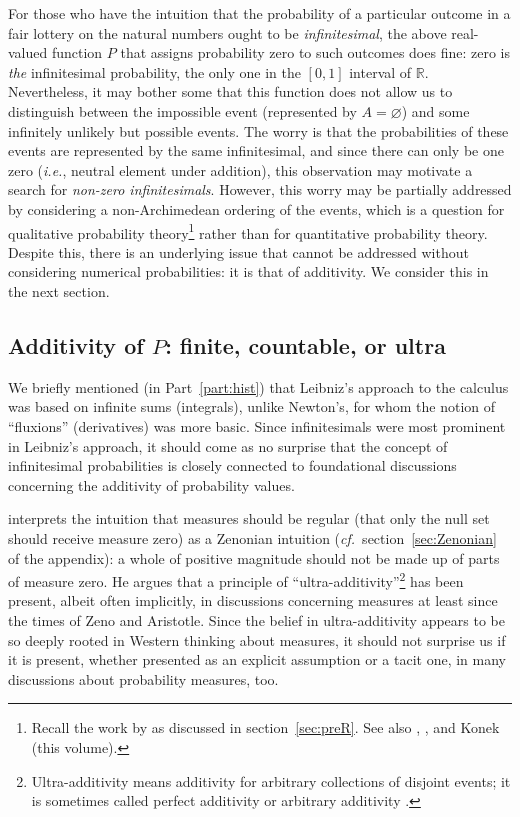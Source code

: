 For those who have the intuition that the probability of a particular outcome in a fair lottery on the natural numbers ought to be \emph{infinitesimal}, the above real-valued function $P$ that assigns probability zero to such outcomes does fine: zero is \emph{the} infinitesimal probability, the only one in the $[0,1]$ interval of $\mathbb{R}$.
Nevertheless, it may bother some that this function does not allow us to distinguish between the impossible event (represented by $A=\varnothing$) and some infinitely unlikely but possible events. The worry is that the probabilities of these events are represented by the same infinitesimal, and since there can only be one zero (\textit{i.e.}, neutral element under addition), this observation may motivate a search for \emph{non-zero infinitesimals}. However, this worry may be partially addressed by considering a non-Archimedean ordering of the events, which is a question for qualitative probability theory\footnote{Recall the work by \citet{deFinetti:1931} as discussed in section~\ref{sec:preR}. See also \citet{Pedersen:2014a}, \citet[p.~17]{Easwaran:2014}, and Konek (this volume).} rather than for quantitative probability theory.
Despite this, there is an underlying issue that cannot be addressed without considering numerical probabilities: it is that of additivity. We consider this in the next section.

\subsection{Additivity of $P$: finite, countable, or ultra}\label{sec:AdditivityOfP}
We briefly mentioned (in Part~\ref{part:hist}) that Leibniz's approach to the calculus was based on infinite sums (integrals), unlike Newton's, for whom the notion of ``fluxions'' (derivatives) was more basic. Since infinitesimals were most prominent in Leibniz's approach, it should come as no surprise that the concept of infinitesimal probabilities is closely connected to foundational discussions concerning the additivity of probability values.

\citet{Skyrms:1983a} interprets the intuition that measures should be regular (that only the null set should receive measure zero) as a Zenonian intuition (\textit{cf.}\ section~\ref{sec:Zenonian} of the appendix): a whole of positive magnitude should not be made up of parts of measure zero.
He argues that a principle of ``ultra-additivity''\footnote{Ultra-additivity means additivity for arbitrary collections of disjoint events; it is sometimes called perfect additivity \citep[see, \textit{e.g.},][Vol.~II, p.~118]{deFinetti:1974} or arbitrary additivity \citep{Hofweber:2014}.} has been present, albeit often implicitly, in discussions concerning measures at least since the times of Zeno and Aristotle. Since the belief in ultra-additivity appears to be so deeply rooted in Western thinking about measures, it should not surprise us if it is present, whether presented as an explicit assumption or a tacit one, in many discussions about probability measures, too.

